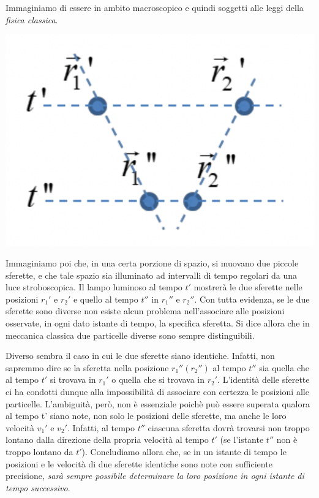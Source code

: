 Immaginiamo di essere in ambito macroscopico e quindi soggetti alle
leggi della \emph{fisica classica}.
\begin{marginfigure}
    \includegraphics{figs/identical-part1}
    \label{fig:identical-part1}
\end{marginfigure}
Immaginiamo poi che, in una certa porzione di spazio, si muovano due
piccole sferette, e che tale spazio sia illuminato ad intervalli di
tempo regolari da una luce stroboscopica.
Il lampo luminoso al tempo
\(t'\) mostrerà le due sferette nelle posizioni \(r_{1}'\) e \(r_{2}'\)
e quello al tempo \(t''\) in \(r_{1}''\) e \(r_{2}''\).
Con tutta
evidenza, se le due sferette sono diverse non esiste alcun problema
nell'associare alle posizioni osservate, in ogni dato istante di tempo,
la specifica sferetta.
Si dice allora che in meccanica classica due
particelle diverse sono sempre distinguibili.

Diverso sembra il caso in cui le due sferette siano identiche.
Infatti,
non sapremmo dire se la sferetta nella posizione \(r_{1}''(r_{2}'')\) al
tempo \(t''\) sia quella che al tempo \(t'\) si trovava in \(r_{1}'\) o
quella che si trovava in \(r_{2}'\).
L'identità delle sferette ci ha
condotti dunque alla impossibilità di associare con certezza le
posizioni alle particelle.
L'ambiguità, però, non è essenziale poichè
può essere superata qualora al tempo t' siano note, non solo le
posizioni delle sferette, ma anche le loro velocità \(v_1'\) e \(v_2'\).
Infatti, al tempo \(t''\) ciascuna sferetta dovrà trovarsi non troppo
lontano dalla direzione della propria velocità al tempo \(t'\) (se
l'istante \(t''\) non è troppo lontano da \(t'\)).
Concludiamo allora
che, se in un istante di tempo le posizioni e le velocità di due
sferette identiche sono note con sufficiente precisione, \emph{sarà sempre
possibile determinare la loro posizione in ogni istante di tempo
successivo}.

